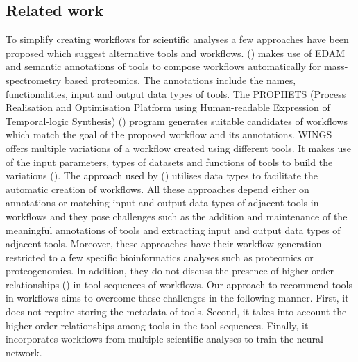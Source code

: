 \documentclass{bioinfo}
\begin{document}
\subsection{Related work}
To simplify creating workflows for scientific analyses a few approaches have been proposed which suggest alternative tools and workflows. (\cite{Palmblad}) makes use of EDAM and semantic annotations of tools to compose workflows automatically for mass-spectrometry based proteomics. The annotations include the names, functionalities, input and output data types of tools. The PROPHETS (Process Realisation and Optimisation Platform using Human-readable Expression of Temporal-logic Synthesis) (\cite{Naujokat}) program generates suitable candidates of workflows which match the goal of the proposed workflow and its annotations. WINGS offers multiple variations of a workflow created using different tools. It makes use of the input parameters, types of datasets and functions of tools to build the variations (\cite{Srivastava2018SemanticWF}). The approach used by (\cite{DiBernardo}) utilises data types to facilitate the automatic creation of workflows. All these approaches depend either on annotations or matching input and output data types of adjacent tools in workflows and they pose challenges such as the addition and maintenance of the meaningful annotations of tools and extracting input and output data types of adjacent tools. Moreover, these approaches have their workflow generation restricted to a few specific bioinformatics analyses such as proteomics or proteogenomics. In addition, they do not discuss the presence of higher-order relationships (\cite{Michalski}) in tool sequences of workflows. Our approach to recommend tools in workflows aims to overcome these challenges in the following manner. First, it does not require storing the metadata of tools. Second, it takes into account the higher-order relationships among tools in the tool sequences. Finally, it incorporates workflows from multiple scientific analyses to train the neural network.
\end{document}
